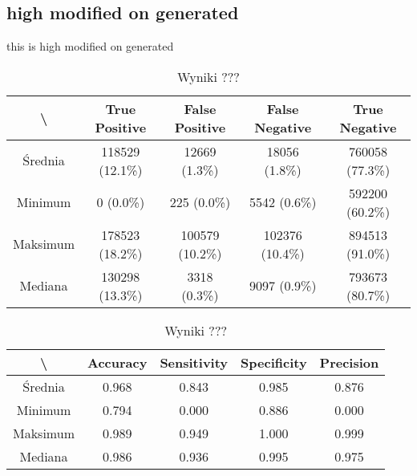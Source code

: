\subsection{high modified on generated}
this is high modified on generated

\begin{table}[H]
	\centering
	\caption{Wyniki ???}
	\vspace{6pt}
	{\footnotesize
		\begin{tabular}{|c|c|c|c|c|}
      \hline \textbackslash & True Positive & False Positive & False Negative & True Negative \\
      \hline Średnia & 118529 (12.1\%) & 12669 (1.3\%) & 18056 (1.8\%) & 760058 (77.3\%) \\
      \hline Minimum & 0 (0.0\%) & 225 (0.0\%) & 5542 (0.6\%) & 592200 (60.2\%) \\
      \hline Maksimum & 178523 (18.2\%) & 100579 (10.2\%) & 102376 (10.4\%) & 894513 (91.0\%) \\
      \hline Mediana & 130298 (13.3\%) & 3318 (0.3\%) & 9097 (0.9\%) & 793673 (80.7\%) \\
      \hline
		\end{tabular}
	}
	\vspace{0pt}
\end{table}


\begin{table}[H]
	\centering
	\caption{Wyniki ???}
	\vspace{6pt}
	{\footnotesize
		\begin{tabular}{|c|c|c|c|c|}
      \hline \textbackslash & Accuracy & Sensitivity & Specificity & Precision \\
      \hline Średnia & 0.968 & 0.843 & 0.985 & 0.876 \\
      \hline Minimum & 0.794 & 0.000 & 0.886 & 0.000 \\
      \hline Maksimum & 0.989 & 0.949 & 1.000 & 0.999 \\
      \hline Mediana & 0.986 & 0.936 & 0.995 & 0.975 \\
      \hline
		\end{tabular}
	}
	\vspace{0pt}
\end{table}

